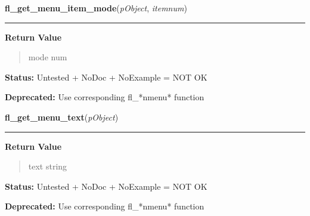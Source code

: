     \label{xformslib:deprecated:fl_get_menu_item_mode}

    \vspace{0.5ex}

\hspace{.8\funcindent}\begin{boxedminipage}{\funcwidth}

    \raggedright \textbf{fl\_get\_menu\_item\_mode}(\textit{pObject}, \textit{itemnum})

    \vspace{-1.5ex}

    \rule{\textwidth}{0.5\fboxrule}
\setlength{\parskip}{2ex}
\setlength{\parskip}{1ex}
      \textbf{Return Value}
    \vspace{-1ex}

      \begin{quote}
      mode num

      \end{quote}

\textbf{Status:} Untested + NoDoc + NoExample = NOT OK



\textbf{Deprecated:} Use corresponding fl\_*nmenu* function



    \end{boxedminipage}

    \label{xformslib:deprecated:fl_get_menu_text}

    \vspace{0.5ex}

\hspace{.8\funcindent}\begin{boxedminipage}{\funcwidth}

    \raggedright \textbf{fl\_get\_menu\_text}(\textit{pObject})

    \vspace{-1.5ex}

    \rule{\textwidth}{0.5\fboxrule}
\setlength{\parskip}{2ex}
\setlength{\parskip}{1ex}
      \textbf{Return Value}
    \vspace{-1ex}

      \begin{quote}
      text string

      \end{quote}

\textbf{Status:} Untested + NoDoc + NoExample = NOT OK



\textbf{Deprecated:} Use corresponding fl\_*nmenu* function



    \end{boxedminipage}

